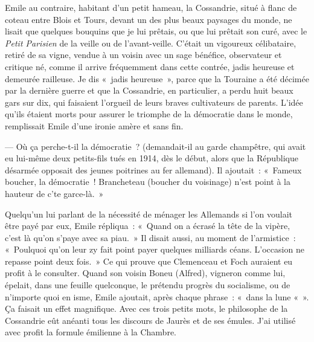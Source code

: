 \documentclass[french,twoside]{book} %
\begin{document}
Emile au contraire, habitant d’un petit hameau, la Cossandrie, situé à flanc de coteau entre Blois et Tours, devant un des plus beaux paysages du monde, ne lisait que quelques bouquins que je lui prêtais, ou que lui prêtait son curé, avec le {\itshape Petit Parisien} de la veille ou de l’avant-veille. C’était un vigoureux célibataire, retiré de sa vigne, vendue à un voisin avec un sage bénéfice, observateur et critique né, comme il arrive fréquemment dans cette contrée, jadis heureuse et demeurée railleuse. Je dis « jadis heureuse », parce que la Touraine a été décimée par la dernière guerre et que la Cossandrie, en particulier, a perdu huit beaux gars sur dix, qui faisaient l’orgueil de leurs braves cultivateurs de parents. L’idée qu’ils étaient morts pour assurer le triomphe de la démocratie dans le monde, remplissait Emile d’une ironie amère et sans fin.\par
— Où ça perche-t-il la démocratie ? (demandait-il au garde champêtre, qui avait eu lui-même deux petits-fils tués en 1914, dès le début, alors que la République désarmée opposait des jeunes poitrines au fer allemand). Il ajoutait : « Fameux boucher, la démocratie ! Brancheteau (boucher du voisinage) n’est point à la hauteur de c’te garce-là. »\par
Quelqu’un lui parlant de la nécessité de ménager les Allemands si l’on voulait être payé par eux, Emile répliqua : « Quand on a écrasé la tête de la vipère, c’est là qu’on s’paye avec sa piau. » Il disait aussi, au moment de l’armistice : « Poulquoi qu’on leur zy fait point payer quelques milliards céans. L’occasion ne repasse point deux fois. » Ce qui prouve que Clemenceau et Foch auraient eu profit à le consulter. Quand son voisin Boneu (Alfred), vigneron comme lui, épelait, dans une feuille quelconque, le prétendu progrès du socialisme, ou de n’importe quoi en isme, Emile ajoutait, après chaque phrase : « dans la lune « ». Ça faisait un effet magnifique. Avec ces trois petits mots, le philosophe de la Cossandrie eût anéanti tous les discours de Jaurès et de ses émules. J’ai utilisé avec profit la formule émilienne à la Chambre.\par
\end{document}
